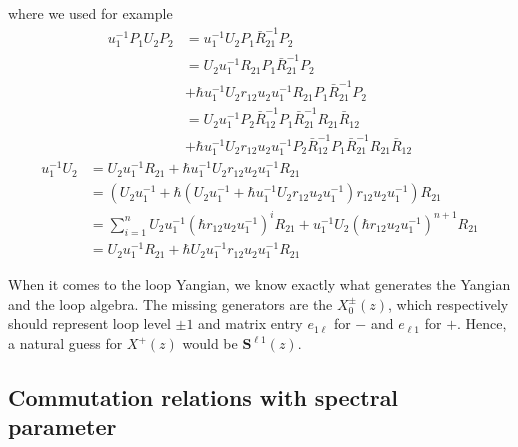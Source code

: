\documentclass[11pt]{report}
\theoremstyle{definition}
\theoremstyle{remark}
\theoremstyle{remark}
\begin{document}
where we used for example
\begin{align*}
u_1^{-1} P_1 U_2 P_2
&= u_1^{-1} U_2 P_1 \bar R_{21}^{-1} P_2 \\
&= U_2 u_1^{-1} R_{21} P_1 \bar R_{21}^{-1} P_2 \\
&+\hbar u_1^{-1} U_2 r_{12} u_2 u_1^{-1} R_{21} P_1 \bar R_{21}^{-1} P_2 \\
&= U_2 u_1^{-1} P_2 \bar R_{12}^{-1} P_1 \bar R_{21}^{-1} R_{21} \bar R_{12} \\
&+\hbar u_1^{-1} U_2 r_{12} u_2 u_1^{-1} P_2 \bar R_{12}^{-1} P_1 \bar R_{21}^{-1} R_{21} \bar R_{12}
\end{align*}
\begin{align*}
u_1^{-1} U_2
&= U_2 u_1^{-1} R_{21} + \hbar u_1^{-1} U_2 r_{12} u_2 u_1^{-1} R_{21} \\
&= (U_2 u_1^{-1} + \hbar (U_2 u_1^{-1} + \hbar u_1^{-1} U_2 r_{12} u_2 u_1^{-1}) r_{12} u_2 u_1^{-1}) R_{21} \\
&= \sum_{i=1}^n U_2 u_1^{-1} (\hbar r_{12} u_2 u_1^{-1})^i R_{21} + u_1^{-1} U_2 (\hbar r_{12} u_2 u_1^{-1})^{n+1} R_{21} \\
&= U_2 u_1^{-1} R_{21} + \hbar U_2 u_1^{-1} r_{12} u_2 u_1^{-1} R_{21}
\end{align*}

When it comes to the loop Yangian, we know exactly what generates the Yangian and the loop algebra. The missing generators are the $X_0^\pm(z)$, which respectively should represent loop level $\pm 1$ and matrix entry $e_{1\ell}$ for $-$ and $e_{\ell 1}$ for $+$. Hence, a natural guess for $X^+(z)$ would be $\mathbf{S}^{\ell 1}(z)$.

\subsection{Commutation relations with spectral parameter}
\end{document}
